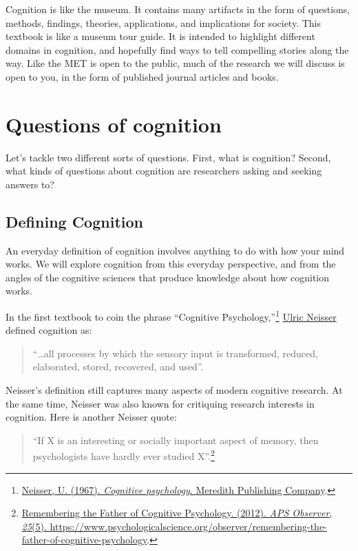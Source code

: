 \documentclass[
  oneside,
  12pt]{crumpbook}
\begin{document}
Cognition is like the museum. It contains many artifacts in the form of questions, methods, findings, theories, applications, and implications for society. This textbook is like a museum tour guide. It is intended to highlight different domains in cognition, and hopefully find ways to tell compelling stories along the way. Like the MET is open to the public, much of the research we will discuss is open to you, in the form of published journal articles and books.

\hypertarget{questions-of-cognition}{%
\section{Questions of cognition}\label{questions-of-cognition}}

Let's tackle two different sorts of questions. First, what is cognition? Second, what kinds of questions about cognition are researchers asking and seeking answers to?

\hypertarget{defining-cognition}{%
\subsection{Defining Cognition}\label{defining-cognition}}

An everyday definition of cognition involves anything to do with how your mind works. We will explore cognition from this everyday perspective, and from the angles of the cognitive sciences that produce knowledge about how cognition works.

In the first textbook to coin the phrase ``Cognitive Psychology,''\footnote{\protect\hyperlink{ref-neisserCognitivePsychology1967}{Neisser, U. (1967). \emph{Cognitive psychology}. {Meredith Publishing Company}}.} \href{https://en.wikipedia.org/wiki/Ulric_Neisser}{Ulric Neisser} defined cognition as:

\begin{quote}
``\ldots all processes by which the sensory input is transformed, reduced, elaborated, stored, recovered, and used''.
\end{quote}

Neisser's definition still captures many aspects of modern cognitive research. At the same time, Neisser was also known for critiquing research interests in cognition. Here is another Neisser quote:

\begin{quote}
``If X is an interesting or socially important aspect of memory, then psychologists have hardly ever studied X''.\footnote{\protect\hyperlink{ref-RememberingFatherCognitive2012}{Remembering the {Father} of {Cognitive Psychology}. (2012). \emph{APS Observer}, \emph{25}(5). \url{https://www.psychologicalscience.org/observer/remembering-the-father-of-cognitive-psychology}}.}
\end{quote}
\end{document}
